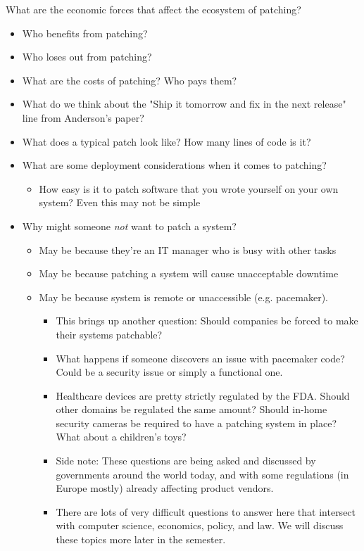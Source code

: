 \documentclass[11pt]{article}
\begin{document}
What are the economic forces that affect the ecosystem of patching?
\begin{itemize}
    \item Who benefits from patching?
    \item Who loses out from patching?
    \item What are the costs of patching? Who pays them?
    \item What do we think about the "Ship it tomorrow and fix in the next release" line from Anderson's paper?
    \item What does a typical patch look like? How many lines of code is it?
    \item What are some deployment considerations when it comes to patching?
    \begin{itemize}
        \item How easy is it to patch software that you wrote yourself on your own system? Even this may not be simple
    \end{itemize}
    \item Why might someone {\it not} want to patch a system?
    \begin{itemize}
        \item May be because they're an IT manager who is busy with other tasks
        \item May be because patching a system will cause unacceptable downtime 
        \item May be because system is remote or unaccessible (e.g. pacemaker). 
        \begin{itemize}
            \item This brings up another question:  Should companies be forced to make their systems patchable?
            \item What happens if someone discovers an issue with pacemaker code? Could be a security issue or simply a functional one. 
            \item Healthcare devices are pretty strictly regulated by the FDA. Should other domains be regulated the same amount? Should in-home security cameras be required to have a patching system in place? What about a children's toys?
            \item Side note: These questions are being asked and discussed by governments around the world today, and with some regulations (in Europe mostly) already affecting product vendors.  
            \item There are lots of very difficult questions to answer here that intersect with computer science, economics, policy, and law. We will discuss these topics more later in the semester.

\end{itemize}
\end{itemize}
\end{itemize}
\end{document}
